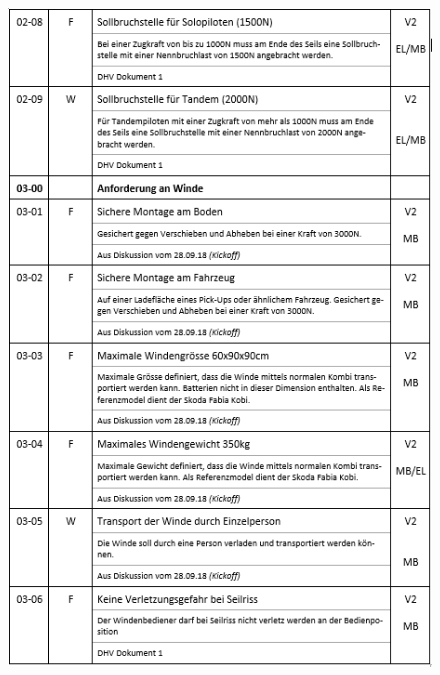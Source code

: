 \begin{figure}[H]
	\begin{center}
		\includegraphics[width=155mm]{appendix/Anforderungen2.png}
	\end{center}
\end{figure}

